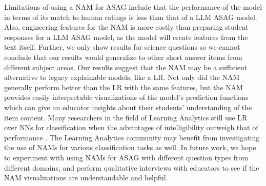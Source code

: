 Limitations of using a NAM for ASAG include that the performance of the model in terms of its match to human ratings is less than that of a LLM ASAG model. Also, engineering features for the NAM is more costly than preparing student responses for a LLM ASAG model, as the model will create features from the text itself. Further, we only show results for science questions so we cannot conclude that our results would generalize to other short answer items from different subject areas. Our results suggest that the NAM may be a sufficient alternative to legacy explainable models, like a LR. Not only did the NAM generally perform better than the LR with the same features, but the NAM provides easily interpretable visualizations of the model’s prediction functions which can give an educator insights about their students’ understanding of the item content. Many researchers in the field of Learning Analytics still use LR over NNs for classification when the advantages of intelligibility outweigh that of performance \cite{le2018communication}\cite{deho2022existing}\cite{alonso2020predicting}\cite{misiejuk2021using}. The Learning Analytics community may benefit from investigating the use of NAMs for various classification tasks as well. In future work, we hope to experiment with using NAMs for ASAG with different question types from different domains, and perform qualitative interviews with educators to see if the NAM visualizations are understandable and helpful. 




